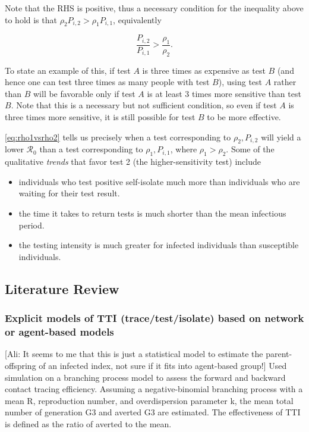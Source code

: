 \documentclass[12pt]{article}
\newcommand{\Rnum}{\mathcal{R}_0}
\theoremstyle{definition} %
\begin{document}
Note that the RHS is positive, thus a necessary condition for the inequality above to hold is that $\rho_2P_{i,2} > \rho_1P_{i,1}$, equivalently 

\begin{equation}
\frac{P_{i,2}}{P_{i,1}} > \frac{\rho_1}{\rho_2}.
\end{equation}

To state an example of this, if test $A$ is three times as expensive as test $B$ (and hence one can test three times as many people with test $B$), using test $A$ rather than $B$ will be favorable only if test $A$ is at least 3 times more sensitive than test $B$. Note that this is a necessary but not sufficient condition, so even if test $A$ is three times more sensitive, it is still possible for test $B$ to be more effective. 

\cref{eq:rho1vsrho2} tells us precisely when a test corresponding to $\rho_2, P_{i,2}$ will yield a lower $\Rnum$ than a test corresponding to $\rho_1, P_{i,1}$, where $\rho_1 > \rho_2$. Some of the qualitative \textit{trends} that favor test 2 (the higher-sensitivity test) include

\begin{itemize}
    \item individuals who test positive self-isolate much more than individuals who are waiting for their test result.
    \item the time it takes to return tests is much shorter than the mean infectious period.
    \item the testing intensity is much greater for infected individuals than susceptible individuals.
\end{itemize}


\subsection{Literature Review}

\subsubsection{Explicit models of TTI (trace/test/isolate) based on network or agent-based models}
\citep{endo2020implication} [Ali: It seems to me that this is just a statistical model to estimate the parent-offspring of an infected index, not sure if it fits into agent-based group!] Used simulation on a branching process model to assess the forward and backward contact tracing efficiency. Assuming a negative-binomial branching process with a mean R, reproduction number, and overdispersion parameter k, the mean total number of generation G3 and averted G3 are estimated. The effectiveness of TTI is defined as the ratio of averted to the mean.
\end{document}
